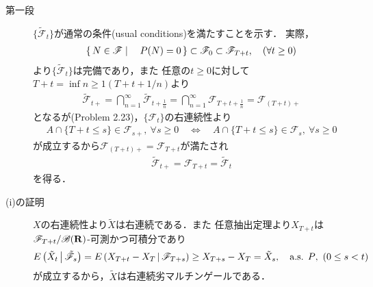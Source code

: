 	\begin{prf}\mbox{}
		\begin{description}
			\item[第一段]
				$\{\tilde{\mathscr{F}}_t\}$が通常の条件(usual conditions)を満たすことを示す．
				実際，
				\begin{align}
					\left\{\, N \in \mathscr{F} \mid \quad P(N)=0\, \right\} 
					\subset \mathscr{F}_0 \subset \mathscr{F}_{T+t},
					\quad (\forall t \geq 0)
				\end{align}
				より$\{\tilde{\mathscr{F}}_t\}$は完備であり，また
				任意の$t \geq 0$に対して$T+t = \inf{n \geq 1}{(T+t+1/n)}$より
				\begin{align}
					\tilde{\mathscr{F}}_{t+}
					= \bigcap_{n=1}^\infty \tilde{\mathscr{F}}_{t+\frac{1}{n}}
					= \bigcap_{n=1}^\infty \mathscr{F}_{T+t+\frac{1}{n}}
					= \mathscr{F}_{(T+t)+}
				\end{align}
				となるが(Problem 2.23)，$\{\mathscr{F}_t\}$の右連続性より
				\begin{align}
					A \cap \{T+t \leq s\} \in \mathscr{F}_{s+},
					\ \forall s \geq 0
					\quad \Leftrightarrow \quad
					A \cap \{T+t \leq s\} \in \mathscr{F}_s,
					\ \forall s \geq 0
				\end{align}
				が成立するから$\mathscr{F}_{(T+t)+} = \mathscr{F}_{T+t}$が満たされ
				\begin{align}
					\tilde{\mathscr{F}}_{t+} = \mathscr{F}_{T+t} = \tilde{\mathscr{F}}_{t}
				\end{align}
				を得る．
				
			\item[(i)の証明]
				$X$の右連続性より$\tilde{X}$は右連続である．また
				任意抽出定理より$X_{T+t}$は$\mathscr{F}_{T+t}/\mathscr{B}(\mathbf{R})$-可測かつ可積分であり
				\begin{align}
					E\left( \tilde{X}_t \, \middle|\, \tilde{\mathscr{F}}_s \right)
					= E\left( X_{T+t} - X_T \, \middle|\, \mathscr{F}_{T+s} \right)
					\geq X_{T+s} - X_T
					= \tilde{X}_s,
					\quad \mbox{a.s. $P$},
					\ (0 \leq s < t)
				\end{align}
				が成立するから，$\tilde{X}$は右連続劣マルチンゲールである．
				

\end{description}
\end{prf}
